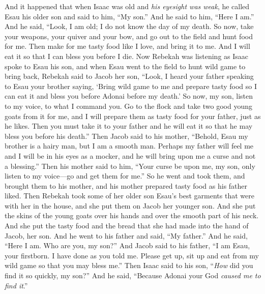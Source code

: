 \begin{biblechapter} %
 And it happened that when Isaac was old and \textit{his eyesight was weak}, he called Esau his older son and said to him, “My son.” And he said to him, “Here I am.”
\verse And he said, “Look, I am old; I do not know the day of my death.
\verse So now, take your weapons, your quiver and your bow, and go out to the field and hunt food for me.
\verse Then make for me tasty food like I love, and bring it to me. And I will eat it so that I can bless you before I die.
\verse Now Rebekah was listening as Isaac spoke to Esau his son, and when Esau went to the field to hunt wild game to bring back,
\verse Rebekah said to Jacob her son, “Look, I heard your father speaking to Esau your brother saying,
\verse ‘Bring wild game to me and prepare tasty food so I can eat it and bless you before Adonai before my death.’
\verse So now, my son, listen to my voice, to what I command you.
\verse Go to the flock and take two good young goats from it for me, and I will prepare them as tasty food for your father, just as he likes.
\verse Then you must take it to your father and he will eat it so that he may bless you before his death.”
\verse Then Jacob said to his mother, “Behold, Esau my brother is a hairy man, but I am a smooth man.
\verse Perhaps my father will feel me and I will be in his eyes as a mocker, and he will bring upon me a curse and not a blessing.”
\verse Then his mother said to him, “Your curse be upon me, my son, only listen to my voice—go and get them for me.”
\verse So he went and took them, and brought them to his mother, and his mother prepared tasty food as his father liked.
\verse Then Rebekah took some of her older son Esau’s best garments that were with her in the house, and she put them on Jacob her younger son.
\verse And she put the skins of the young goats over his hands and over the smooth part of his neck.
\verse And she put the tasty food and the bread that she had made into the hand of Jacob, her son.
\verse And he went to his father and said, “My father.” And he said, “Here I am. Who are you, my son?”
\verse And Jacob said to his father, “I am Esau, your firstborn. I have done as you told me. Please get up, sit up and eat from my wild game so that you may bless me.”
\verse Then Isaac said to his son, “\textit{How} did you find it so quickly, my son?” And he said, “Because Adonai your God \textit{caused me to find it}.”

\end{biblechapter}
